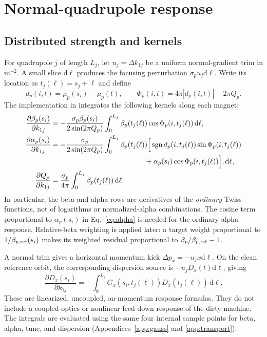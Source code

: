 \documentclass[11pt,a4paper]{article}
\newcommand{\dd}{\mathrm{d}}
\newcommand{\code}[1]{\texttt{\detokenize{#1}}}
\DeclareMathOperator{\sgn}{sgn}
\begin{document}
\section{Normal-quadrupole response}
\label{sec:normal}

\subsection{Distributed strength and kernels}

For quadrupole $j$ of length $L_j$, let $u_j=\Delta k_{1j}$ be a uniform
normal-gradient trim in $\mathrm{m}^{-2}$. A small slice $\dd\ell$ produces
the focusing perturbation $\sigma_p u_j\dd\ell$. Write its location as
$t_j(\ell)=s_j+\ell$ and define
\begin{equation}
 d_p(i,t)=\mu_p(s_i)-\mu_p(t),\qquad
 \Phi_p(i,t)=4\pi|d_p(i,t)|-2\pi Q_p.
\end{equation}
The implementation in \code{normal_quadrupole_response} integrates the
following kernels along each magnet:
\begin{align}
 \frac{\partial\beta_p(s_i)}{\partial k_{1j}}
 &= -\frac{\sigma_p\beta_p(s_i)}{2\sin(2\pi Q_p)}
 \int_0^{L_j}\beta_p(t_j(\ell))
       \cos\Phi_p(i,t_j(\ell))\,\dd\ell,
 \label{eq:beta}\\
 \frac{\partial\alpha_p(s_i)}{\partial k_{1j}}
 &= -\frac{\sigma_p}{2\sin(2\pi Q_p)}
 \int_0^{L_j}\beta_p(t_j(\ell))
 \Big[\sgn d_p(i,t_j(\ell))\sin\Phi_p(i,t_j(\ell))
 \nonumber\\[-2pt]
 &\hspace{46mm}+\alpha_p(s_i)\cos\Phi_p(i,t_j(\ell))\Big],\dd\ell,
 \label{eq:alpha}\\
 \frac{\partial Q_p}{\partial k_{1j}}
 &=\frac{\sigma_p}{4\pi}\int_0^{L_j}\beta_p(t_j(\ell))\,\dd\ell.
 \label{eq:tuneanalytic}
\end{align}
In particular, the beta and alpha rows are derivatives of the \emph{ordinary}
Twiss functions, not of logarithms or normalized-alpha combinations. The
cosine term proportional to $\alpha_p(s_i)$ in Eq.~\eqref{eq:alpha} is needed
for the ordinary-alpha response. Relative-beta weighting is applied later:
a target weight proportional to $1/\beta_{p,\rm ref}(s_i)$ makes its weighted
residual proportional to $\beta_p/\beta_{p,\rm ref}-1$.

A normal trim gives a horizontal momentum kick
$\Delta p_x=-u_j x\dd\ell$. On the clean reference orbit, the corresponding
dispersion source is $-u_jD_x(t)\dd\ell$, giving
\begin{equation}
 \frac{\partial D_x(s_i)}{\partial k_{1j}}
 =-\int_0^{L_j}G_x(s_i,t_j(\ell))D_x(t_j(\ell))\,\dd\ell.
 \label{eq:dx}
\end{equation}
These are linearized, uncoupled, on-momentum response formulas. They do not
include a coupled-optics or nonlinear feed-down response of the dirty machine.
The integrals are evaluated using the same four internal sample points for
beta, alpha, tune, and dispersion (Appendices~\ref{app:gauss} and
\ref{app:transport}).
\end{document}
